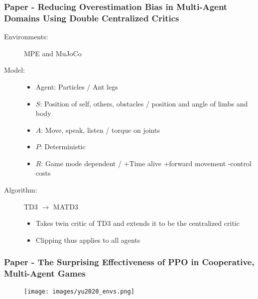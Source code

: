 \documentclass{beamer}
\begin{document}
\begin{frame} %
    \frametitle{Paper \thepapercounter - Reducing Overestimation Bias in Multi-Agent Domains 
    Using Double Centralized Critics}
    \begin{description}
        \item[Environments:] MPE and MuJoCo 
        \item[Model:]
        \begin{itemize}
            \item Agent:  Particles / Ant legs
            \item $S$: Position of self, others, obstacles / position and angle of limbs and body
            \item $A$: Move, speak, listen / torque on joints
            \item $P$: Deterministic
            \item $R$: Game mode dependent / +Time alive +forward movement -control costs
        \end{itemize}
        \item[Algorithm:] TD3 $\rightarrow$ MATD3
        \begin{itemize}
            \item Takes twin critic of TD3 and extends it to be the centralized critic
            \item Clipping thus applies to all agents
        \end{itemize}
    \end{description}
\end{frame}

\begin{frame} %
    \frametitle{Paper \thepapercounter - The Surprising Effectiveness of PPO in Cooperative, 
    Multi-Agent Games}
    \begin{description}\small
        \item[Environments:] 
    \end{description}
    \begin{figure}\small\vspace*{-1em}
        \texttt{[image: images/yu2020\_envs.png]}
    \end{figure}
\end{frame}
\end{document}
